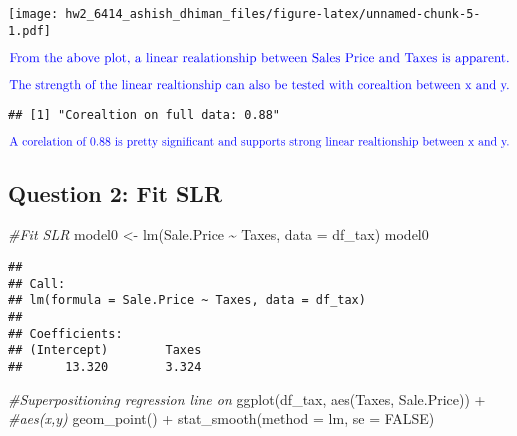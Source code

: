 \documentclass[
]{article}
\newenvironment{Shaded}{\begin{snugshade}}{\end{snugshade}}
\newcommand{\AttributeTok}[1]{\textcolor[rgb]{0.77,0.63,0.00}{#1}}
\newcommand{\CommentTok}[1]{\textcolor[rgb]{0.56,0.35,0.01}{\textit{#1}}}
\newcommand{\ConstantTok}[1]{\textcolor[rgb]{0.00,0.00,0.00}{#1}}
\newcommand{\DecValTok}[1]{\textcolor[rgb]{0.00,0.00,0.81}{#1}}
\newcommand{\FunctionTok}[1]{\textcolor[rgb]{0.00,0.00,0.00}{#1}}
\newcommand{\NormalTok}[1]{#1}
\newcommand{\OtherTok}[1]{\textcolor[rgb]{0.56,0.35,0.01}{#1}}
\newcommand{\SpecialCharTok}[1]{\textcolor[rgb]{0.00,0.00,0.00}{#1}}
\newcommand{\StringTok}[1]{\textcolor[rgb]{0.31,0.60,0.02}{#1}}
\begin{document}
\texttt{[image: hw2\_6414\_ashish\_dhiman\_files/figure-latex/unnamed-chunk-5-1.pdf]}

\(\color{blue}{\text{From the above plot, a linear realationship between Sales Price and Taxes is apparent.}}\)

\(\color{blue}{\text{The strength of the linear realtionship can also be tested with corealtion between x and y.}}\)

\begin{Shaded}
\end{Shaded}

\begin{verbatim}
## [1] "Corealtion on full data: 0.88"
\end{verbatim}

\(\color{blue}{\text{A corelation of 0.88 is pretty significant and supports strong linear realtionship between x and y.}}\)

\hypertarget{question-2-fit-slr}{%
\subsection{Question 2: Fit SLR}\label{question-2-fit-slr}}

\begin{Shaded}
\begin{Highlighting}[]
\CommentTok{\#Fit SLR}
\NormalTok{model0 }\OtherTok{\textless{}{-}} \FunctionTok{lm}\NormalTok{(Sale.Price }\SpecialCharTok{\textasciitilde{}}\NormalTok{ Taxes, }\AttributeTok{data =}\NormalTok{ df\_tax)}
\NormalTok{model0}
\end{Highlighting}
\end{Shaded}

\begin{verbatim}
## 
## Call:
## lm(formula = Sale.Price ~ Taxes, data = df_tax)
## 
## Coefficients:
## (Intercept)        Taxes  
##      13.320        3.324
\end{verbatim}

\begin{Shaded}
\begin{Highlighting}[]
\CommentTok{\#Superpositioning regression line on }
\FunctionTok{ggplot}\NormalTok{(df\_tax, }\FunctionTok{aes}\NormalTok{(Taxes, Sale.Price)) }\SpecialCharTok{+} \CommentTok{\#aes(x,y)}
  \FunctionTok{geom\_point}\NormalTok{() }\SpecialCharTok{+}
  \FunctionTok{stat\_smooth}\NormalTok{(}\AttributeTok{method =}\NormalTok{ lm, }\AttributeTok{se =} \ConstantTok{FALSE}\NormalTok{)}
\end{Highlighting}
\end{Shaded}
\end{document}
